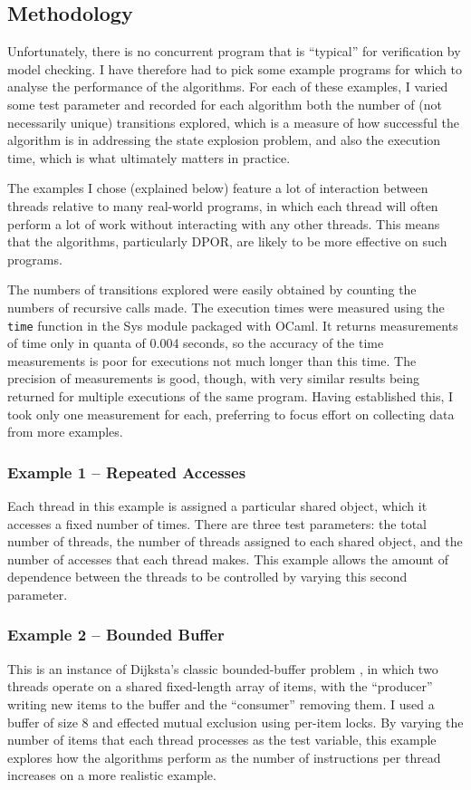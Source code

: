 \documentclass[12pt,a4paper,twoside,openany]{report}
\begin{document}
\subsection{Methodology}
Unfortunately, there is no concurrent program
that is ``typical'' for verification by model
checking. I have therefore had to pick some
example programs for which to analyse the performance
of the algorithms. For each of these examples, I varied
some test parameter and recorded for each algorithm
both the number of (not necessarily unique) transitions
explored, which is a measure of how successful
the algorithm is in addressing the state
explosion problem, and also
the execution time, which is what ultimately
matters in practice.

The examples
I chose (explained below) feature a lot
of interaction between threads relative
to many real-world programs, in which
each thread will often perform a lot
of work without interacting with any
other threads. This means that the
algorithms, particularly DPOR, are likely to be more
effective on such programs.

The numbers of transitions explored were easily
obtained by counting the numbers of recursive calls made.
The execution times were measured using the \texttt{time}
function in the Sys module packaged with OCaml. It returns
measurements of time only in quanta of 0.004 seconds,
so the accuracy of the time measurements is poor for
executions not much longer than this time.
The precision of measurements
is good, though, with very similar results being returned
for multiple executions of the same program.
Having established this,
I took only one measurement
for each, preferring
to focus effort on collecting data
from more examples.

\subsubsection{Example 1 -- Repeated Accesses}
Each thread in this example is assigned a particular
shared object, which it accesses a
fixed number of times. There are three test parameters:
the total number of threads, the number of threads
assigned to each shared object, and the
number of accesses that each thread
makes. This example allows
the amount of dependence between the threads
to be controlled by varying this second parameter.
\newpage
\subsubsection{Example 2 -- Bounded Buffer}
This is an instance of Dijksta's classic bounded-buffer problem
\cite{dijk74},
in which two threads operate on a shared fixed-length
array of items, with the ``producer''
writing new items to the buffer and the
``consumer'' removing them.
I used a buffer of size 8 and effected mutual
exclusion using per-item locks. By varying
the number of items that each thread processes
as the test variable, this example explores
how the algorithms perform as the number
of instructions per thread increases on a
more realistic example.
\end{document}
